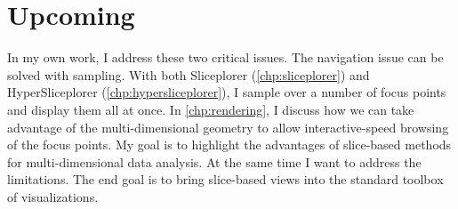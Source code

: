 
\section{Upcoming}
\label{sec:thesis_outline}

In my own work, I address these two critical issues. The navigation issue can
be solved with sampling. With both Sliceplorer (\autoref{chp:sliceplorer}) and
HyperSliceplorer (\autoref{chp:hypersliceplorer}), I sample over a number of
focus points and display them all at once. In \autoref{chp:rendering}, I
discuss how we can take advantage of the multi-dimensional geometry to allow
interactive-speed browsing of the focus points. My goal is to highlight the
advantages of slice-based methods for multi-dimensional data analysis. At the
same time I want to address the limitations. The end goal is to bring
slice-based views into the standard toolbox of visualizations.

